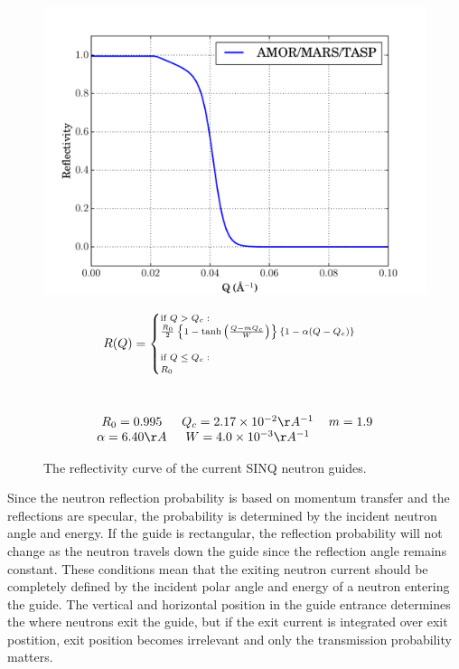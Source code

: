 \documentclass[a4paper]{jpconf}
\begin{document}
\begin{figure}[h]
\begin{minipage}{14pc}
\includegraphics[scale=.4]{graphics/refl.pdf}
\caption{\label{SINQ_reflectivity} The reflectivity curve of the current SINQ neutron guides.}
\end{minipage}\hspace{5pc}%
\begin{minipage}{11pc}
\begin{multline}\label{eq:ref}\scriptsize
R(Q) = 
\begin{cases}
    \mbox{if } Q > Q_c : \\
    \frac{R_0}{2}\left\{  1 - \tanh\left(  \frac{Q - m Q_c}{W}\right) \right\}\{1-\alpha(Q-Q_c)\} \\
    \\
    \mbox{if } Q \leq Q_c :\\
    R_0 \\
\end{cases} \\ \\ \\
\begin{tabular}{c c c}
$R_0=0.995$ & $Q_c=2.17\times10^{-2}\AA^{-1}$ & $m=1.9$ \\ 
$\alpha=6.40 \AA$ & $W=4.0\times10^{-3} \AA^{-1}$ 
\end{tabular} \\
\end{multline}
\end{minipage} 
\end{figure}

Since the neutron reflection probability is based on momentum transfer and the reflections are specular, the probability is determined by the incident neutron angle and energy.  If the guide is rectangular, the reflection probability will not change as the neutron travels down the guide since the reflection angle remains constant.  These conditions mean that the exiting neutron current should be completely defined by the incident polar angle and energy of a neutron entering the guide.  The vertical and horizontal position in the guide entrance determines the where neutrons exit the guide, but if the exit current is integrated over exit postition, exit position becomes irrelevant and only the transmission probability matters.
\end{document}
